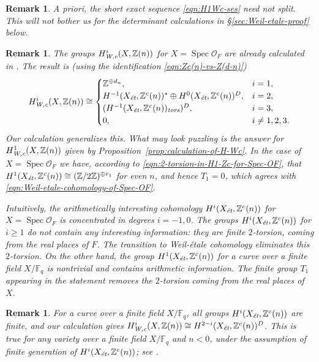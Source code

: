 \documentclass[draft]{article}
\DeclareMathOperator{\Spec}{Spec}
\newcommand{\FF}{\mathbb{F}}
\newcommand{\ZZ}{\mathbb{Z}}
\newcommand{\et}{\text{\it \'{e}t}}
\newcommand{\tors}{\text{\it tors}}
\newcommand{\Wc}{\text{\it W,c}}
\theoremstyle{myplain}
\theoremstyle{mydefinition}
\newtheorem{remark}[theorem]{Remark}
\begin{document}
\begin{remark}
  A priori, the short exact sequence \eqref{eqn:H1Wc-ses} need not split.
  This will not bother us for the determinant calculations in
  \S\ref{sec:Weil-etale-proof} below.
\end{remark}

\begin{remark}
  The groups $H^i_\Wc (X, \ZZ(n))$ for $X = \Spec \mathcal{O}_F$ are already
  calculated in \cite[\S 5.8.3]{Flach-Morin-2018}. The result is (using the
  identification \eqref{eqn:Zc(n)-vs-Z(d-n)})
  \begin{equation}
    \label{eqn:Weil-etale-cohomology-of-Spec-OF}
    H^i_\Wc (X, \ZZ(n)) \cong
    \begin{cases}
      \ZZ^{\oplus d_n}, & i = 1, \\
      H^{-1} (X_\et, \ZZ^c (n))^* \oplus H^0 (X_\et, \ZZ^c (n))^D, & i = 2, \\
      (H^{-1} (X_\et, \ZZ^c (n))_\tors)^D, & i = 3, \\
      0, & i \ne 1,2,3.
    \end{cases}
  \end{equation}
  Our calculation generalizes this. What may look puzzling is the answer for
  $H^1_\Wc (X,\ZZ(n))$ given by Proposition~\ref{prop:calculation-of-H-Wc}.
  In the case of $X = \Spec \mathcal{O}_F$ we have, according to
  \eqref{eqn:2-torsion-in-H1-Zc-for-Spec-OF}, that
  $H^1 (X_\et, \ZZ^c(n)) \cong (\ZZ/2\ZZ)^{\oplus r_1}$ for even $n$, and
  hence $T_1 = 0$, which agrees with
  \eqref{eqn:Weil-etale-cohomology-of-Spec-OF}.

  Intuitively, the arithmetically interesting cohomology $H^i (X_\et, \ZZ^c(n))$
  for $X = \Spec \mathcal{O}_F$ is concentrated in degrees $i = -1,0$. The
  groups $H^i (X_\et, \ZZ^c (n))$ for $i \ge 1$ do not contain any interesting
  information: they are finite $2$-torsion, coming from the real places of
  $F$. The transition to Weil-\'{e}tale cohomology eliminates this
  $2$-torsion. On the other hand, the group $H^1 (X_\et, \ZZ^c (n))$ for a curve
  over a finite field $X/\FF_q$ is nontrivial and contains arithmetic
  information. The finite group $T_1$ appearing in the statement removes the
  $2$-torsion coming from the real places of $X$.
\end{remark}

\begin{remark}
  For a curve over a finite field $X/\FF_q$, all groups $H^i (X_\et, \ZZ^c(n))$
  are finite, and our calculation gives
  $H^i_\Wc (X, \ZZ(n)) \cong H^{2-i} (X_\et, \ZZ^c(n))^D$.
  This is true for any variety over a finite field $X/\FF_q$ and $n < 0$, under
  the assumption of finite generation of $H^i (X_\et, \ZZ^c(n))$; see
  \cite[Proposition~7.7]{Beshenov-Weil-etale-1}.
\end{remark}
\end{document}
